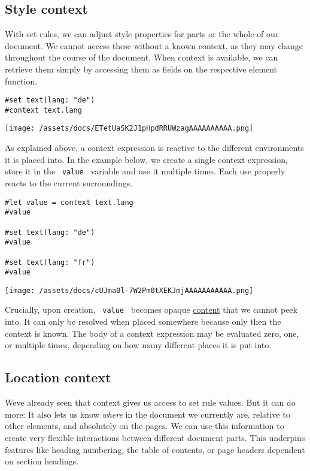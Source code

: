 \subsection{Style context}\label{style-context}

With set rules, we can adjust style properties for parts or the whole of
our document. We cannot access these without a known context, as they
may change throughout the course of the document. When context is
available, we can retrieve them simply by accessing them as fields on
the respective element function.

\begin{verbatim}
#set text(lang: "de")
#context text.lang
\end{verbatim}

\texttt{[image: /assets/docs/ETetUaSK2J1pHpdRRUWzagAAAAAAAAAA.png]}

As explained above, a context expression is reactive to the different
environments it is placed into. In the example below, we create a single
context expression, store it in the \texttt{\ value\ } variable and use
it multiple times. Each use properly reacts to the current surroundings.

\begin{verbatim}
#let value = context text.lang
#value

#set text(lang: "de")
#value

#set text(lang: "fr")
#value
\end{verbatim}

\texttt{[image: /assets/docs/cUJma0l-7W2Pm0tXEKJmjAAAAAAAAAAA.png]}

Crucially, upon creation, \texttt{\ value\ } becomes opaque
\href{/docs/reference/foundations/content/}{content} that we cannot peek
into. It can only be resolved when placed somewhere because only then
the context is known. The body of a context expression may be evaluated
zero, one, or multiple times, depending on how many different places it
is put into.

\subsection{Location context}\label{location-context}

We\textquotesingle ve already seen that context gives us access to set
rule values. But it can do more: It also lets us know \emph{where} in
the document we currently are, relative to other elements, and
absolutely on the pages. We can use this information to create very
flexible interactions between different document parts. This underpins
features like heading numbering, the table of contents, or page headers
dependent on section headings.

